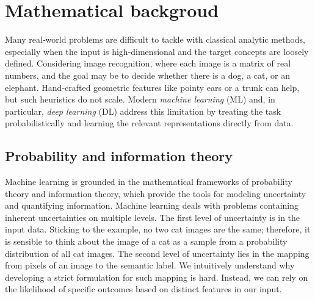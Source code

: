 \chapter{Mathematical backgroud}
\label{sec:ML-background}
Many real‑world problems are difficult to tackle with classical analytic methods, especially when the input is high‑dimensional and the target concepts are loosely defined. Considering image recognition, where each image is a matrix of real numbers, and the goal may be to decide whether there is a dog, a cat, or an elephant. Hand‑crafted geometric features like pointy ears or a trunk can help, but such heuristics do not scale. Modern \emph{machine learning} (ML) and, in particular, \emph{deep learning} (DL) address this limitation by treating the task probabilistically and learning the relevant representations directly from data. 

\section{Probability and information theory}

Machine learning is grounded in the mathematical frameworks of probability theory and information theory, which provide the tools for modeling uncertainty and quantifying information. Machine learning deals with problems containing inherent uncertainties on multiple levels. The first level of uncertainty is in the input data. Sticking to the example, no two cat images are the same; therefore, it is sensible to think about the image of a cat as a sample from a probability distribution of all cat images. The second level of uncertainty lies in the mapping from pixels of an image to the semantic label. We intuitively understand why developing a strict formulation for such mapping is hard. Instead, we can rely on the likelihood of specific outcomes based on distinct features in our input. 

